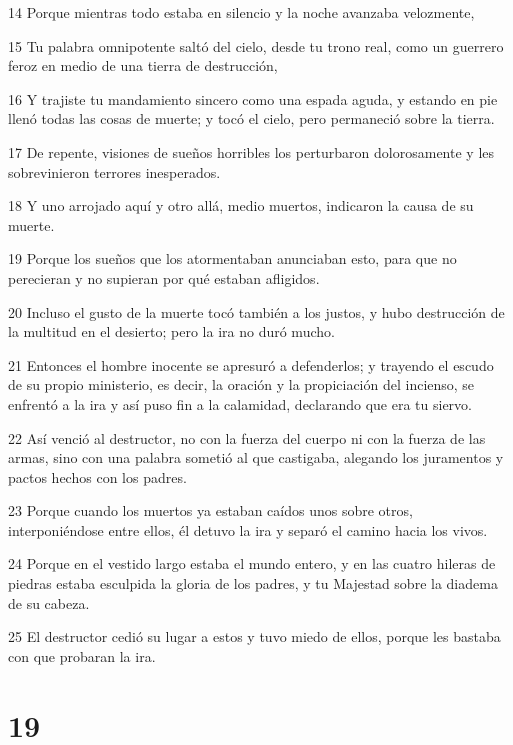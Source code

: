 \par 14 Porque mientras todo estaba en silencio y la noche avanzaba velozmente,
\par 15 Tu palabra omnipotente saltó del cielo, desde tu trono real, como un guerrero feroz en medio de una tierra de destrucción,
\par 16 Y trajiste tu mandamiento sincero como una espada aguda, y estando en pie llenó todas las cosas de muerte; y tocó el cielo, pero permaneció sobre la tierra.
\par 17 De repente, visiones de sueños horribles los perturbaron dolorosamente y les sobrevinieron terrores inesperados.
\par 18 Y uno arrojado aquí y otro allá, medio muertos, indicaron la causa de su muerte.
\par 19 Porque los sueños que los atormentaban anunciaban esto, para que no perecieran y no supieran por qué estaban afligidos.
\par 20 Incluso el gusto de la muerte tocó también a los justos, y hubo destrucción de la multitud en el desierto; pero la ira no duró mucho.
\par 21 Entonces el hombre inocente se apresuró a defenderlos; y trayendo el escudo de su propio ministerio, es decir, la oración y la propiciación del incienso, se enfrentó a la ira y así puso fin a la calamidad, declarando que era tu siervo.
\par 22 Así venció al destructor, no con la fuerza del cuerpo ni con la fuerza de las armas, sino con una palabra sometió al que castigaba, alegando los juramentos y pactos hechos con los padres.
\par 23 Porque cuando los muertos ya estaban caídos unos sobre otros, interponiéndose entre ellos, él detuvo la ira y separó el camino hacia los vivos.
\par 24 Porque en el vestido largo estaba el mundo entero, y en las cuatro hileras de piedras estaba esculpida la gloria de los padres, y tu Majestad sobre la diadema de su cabeza.
\par 25 El destructor cedió su lugar a estos y tuvo miedo de ellos, porque les bastaba con que probaran la ira.

\chapter{19}

